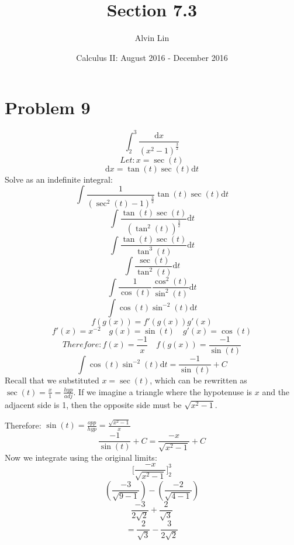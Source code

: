 \documentclass[letterpaper, 12pt]{article}
\title{Section 7.3}
\author{Alvin Lin}
\date{Calculus II: August 2016 - December 2016}
\newcommand*{\diff}{\mathrm{d}}
\begin{document}
\maketitle

\section*{Problem 9}
\[ \int_{2}^{3}{\frac{\diff{x}}{(x^{2}-1)^{\frac{3}{2}}}} \]
\[ Let: x = \sec(t) \]
\[ \diff{x} = \tan(t)\sec(t)\diff{t} \]
Solve as an indefinite integral:
\[ \int{\frac{1}{(\sec^{2}(t)-1)^{\frac{3}{2}}}\tan(t)\sec(t)\diff{t}} \]
\[ \int{\frac{\tan(t)\sec(t)}{(\tan^{2}(t))^{\frac{3}{2}}}\diff{t}} \]
\[ \int{\frac{\tan(t)\sec(t)}{\tan^{3}(t)}\diff{t}} \]
\[ \int{\frac{\sec(t)}{\tan^{2}(t)}\diff{t}} \]
\[ \int{\frac{1}{\cos(t)}\frac{\cos^{2}(t)}{\sin^{2}(t)}\diff{t}} \]
\[ \int{\cos(t)\sin^{-2}(t)\diff{t}} \]
\[ f(g(x)) = f'(g(x))g'(x) \]
\[ f'(x) = x^{-2} \quad g(x) = \sin(t) \quad g'(x) = \cos(t) \]
\[ Therefore: f(x) = \frac{-1}{x} \quad f(g(x)) = \frac{-1}{\sin(t)} \]
\[ \int{\cos(t)\sin^{-2}(t)\diff{t}} = \frac{-1}{\sin(t)}+C \]
Recall that we substituted \( x = \sec(t) \), which can be rewritten as
\( \sec(t) = \frac{x}{1} = \frac{hyp}{adj} \). If we imagine a triangle where
the hypotenuse is \( x \) and the adjacent side is 1, then the opposite side
must be \( \sqrt{x^{2}-1} \).
\begin{center}
\end{center}
Therefore: \( \sin(t) = \frac{opp}{hyp} = \frac{\sqrt{x^{2}-1}}{x} \)
\[ \frac{-1}{\sin(t)}+C = \frac{-x}{\sqrt{x^{2}-1}}+C \]
Now we integrate using the original limits:
\[ \bigg[\frac{-x}{\sqrt{x^{2}-1}}\bigg]_{2}^{3} \]
\[ (\frac{-3}{\sqrt{9-1}})-(\frac{-2}{\sqrt{4-1}}) \]
\[ \frac{-3}{2\sqrt{2}}+\frac{2}{\sqrt{3}} \]
\[ = \frac{2}{\sqrt{3}}-\frac{3}{2\sqrt{2}} \]
\end{document}
